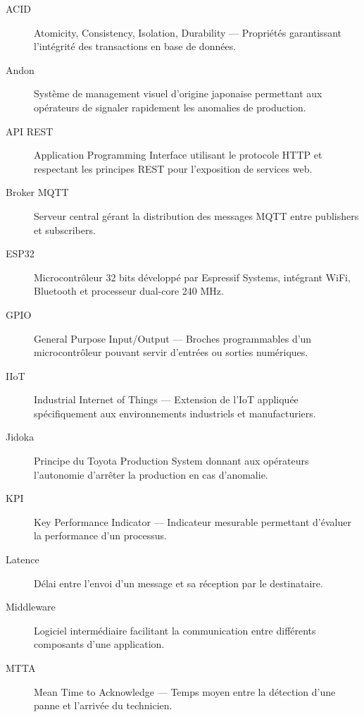 \begin{description}
    \item[ACID] Atomicity, Consistency, Isolation, Durability --- Propriétés garantissant l'intégrité des transactions en base de données.
    
    \item[Andon] Système de management visuel d'origine japonaise permettant aux opérateurs de signaler rapidement les anomalies de production.
    
    \item[API REST] Application Programming Interface utilisant le protocole HTTP et respectant les principes REST pour l'exposition de services web.
    
    \item[Broker MQTT] Serveur central gérant la distribution des messages MQTT entre publishers et subscribers.
    
    \item[ESP32] Microcontrôleur 32 bits développé par Espressif Systems, intégrant WiFi, Bluetooth et processeur dual-core 240 MHz.
    
    \item[GPIO] General Purpose Input/Output --- Broches programmables d'un microcontrôleur pouvant servir d'entrées ou sorties numériques.
    
    \item[IIoT] Industrial Internet of Things --- Extension de l'IoT appliquée spécifiquement aux environnements industriels et manufacturiers.
    
    \item[Jidoka] Principe du Toyota Production System donnant aux opérateurs l'autonomie d'arrêter la production en cas d'anomalie.
    
    \item[KPI] Key Performance Indicator --- Indicateur mesurable permettant d'évaluer la performance d'un processus.
    
    \item[Latence] Délai entre l'envoi d'un message et sa réception par le destinataire.
    
    \item[Middleware] Logiciel intermédiaire facilitant la communication entre différents composants d'une application.
    
    \item[MTTA] Mean Time to Acknowledge --- Temps moyen entre la détection d'une panne et l'arrivée du technicien.
    

\end{description}
